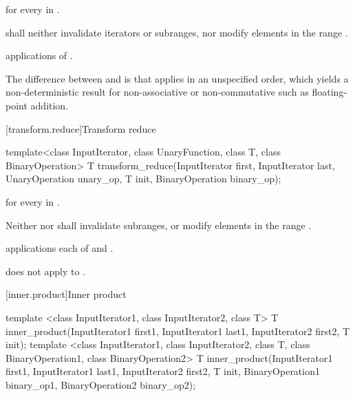 \begin{itemdescr}
\pnum
\returns
{} for every  in .

\pnum
\requires
{} shall neither invalidate iterators or subranges, nor modify
elements in the range .

\pnum
\complexity
{} applications of .

\pnum
\realnotes
The difference between  and  is that
 applies  in an unspecified order, which yields
a non-deterministic result for non-associative or non-commutative
 such as floating-point addition.
\end{itemdescr}

[transform.reduce]{Transform reduce}

%
\begin{itemdecl}
template<class InputIterator, class UnaryFunction, class T, class BinaryOperation>
  T transform_reduce(InputIterator first, InputIterator last,
                     UnaryOperation unary_op, T init, BinaryOperation binary_op);
\end{itemdecl}

\begin{itemdescr}
\pnum
\returns
{} for every  in .

\pnum
\requires
Neither  nor  shall invalidate subranges, or
modify elements in the range .

\pnum
\complexity
{} applications each of  and
.

\pnum
\realnotes
{} does not apply  to .
\end{itemdescr}

[inner.product]{Inner product}

%
\begin{itemdecl}
template <class InputIterator1, class InputIterator2, class T>
  T inner_product(InputIterator1 first1, InputIterator1 last1,
                  InputIterator2 first2, T init);
template <class InputIterator1, class InputIterator2, class T,
          class BinaryOperation1, class BinaryOperation2>
  T inner_product(InputIterator1 first1, InputIterator1 last1,
                  InputIterator2 first2, T init,
                  BinaryOperation1 binary_op1,
                  BinaryOperation2 binary_op2);
\end{itemdecl}

